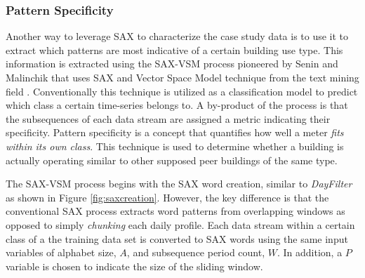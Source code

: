 \subsubsection{Pattern Specificity}
\label{sec:patternspec}

Another way to leverage SAX to characterize the case study data is to use it to extract which patterns are most indicative of a certain building use type. This information is extracted using the SAX-VSM process pioneered by Senin and Malinchik that uses SAX and Vector Space Model technique from the text mining field \cite{Senin_2013}. Conventionally this technique is utilized as a classification model to predict which class a certain time-series belongs to. A by-product of the process is that the subsequences of each data stream are assigned a metric indicating their specificity. Pattern specificity is a concept that quantifies how well a meter \emph{fits within its own class}. This technique is used to determine whether a building is actually operating similar to other supposed peer buildings of the same type.

The SAX-VSM process begins with the SAX word creation, similar to \emph{DayFilter} as shown in Figure \ref{fig:saxcreation}. However, the key difference is that the conventional SAX process extracts word patterns from overlapping windows as opposed to simply \emph{chunking} each daily profile. Each data stream within a certain class of a the training data set is converted to SAX words using the same input variables of alphabet size, $A$, and subsequence period count, $W$. In addition, a $P$ variable is chosen to indicate the size of the sliding window. 